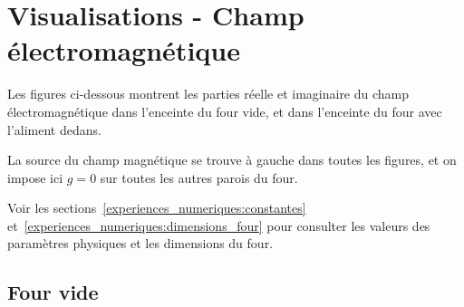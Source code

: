 \section{Visualisations - Champ électromagnétique}

Les figures ci-dessous montrent les parties réelle
et imaginaire du champ électromagnétique dans l'enceinte du four vide,
et dans l'enceinte du four avec l'aliment dedans.

La source du champ magnétique se trouve à gauche dans toutes les
figures, et on impose ici $g = 0$ sur toutes les autres parois
du four.

Voir les sections~\ref{experiences_numeriques:constantes}
et~\ref{experiences_numeriques:dimensions_four} pour consulter
les valeurs des paramètres physiques et les dimensions du four.

\subsection{Four vide}

